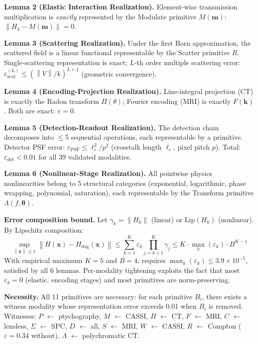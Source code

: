 \documentclass[11pt,a4paper]{article}
\newcommand{\norm}[1]{\left\|#1\right\|}
\newcommand{\eps}{\varepsilon}
\begin{document}
\textbf{Lemma 2 (Elastic Interaction Realization).}
Element-wise transmission multiplication is \emph{exactly} represented by the Modulate primitive $M(\mathbf{m})$: $\norm{H_k - M(\mathbf{m})} = 0$.

\textbf{Lemma 3 (Scattering Realization).}
Under the first Born approximation, the scattered field is a linear functional representable by the Scatter primitive $R$.  Single-scattering representation is exact; $L$-th order multiple scattering error: $\eps_{\mathrm{scat}}^{(L)} \leq (\norm{V}/k)^{L+1}$ (geometric convergence).

\textbf{Lemma 4 (Encoding-Projection Realization).}
Line-integral projection (CT) is exactly the Radon transform $\Pi(\theta)$; Fourier encoding (MRI) is exactly $F(\mathbf{k})$.  Both are exact: $\eps = 0$.

\textbf{Lemma 5 (Detection-Readout Realization).}
The detection chain decomposes into $\leq$5 sequential operations, each representable by a primitive.  Detector PSF error: $\eps_{\mathrm{PSF}} \leq \ell_c^2/p^2$ (crosstalk length $\ell_c$, pixel pitch $p$).  Total: $\eps_{\mathrm{det}} < 0.01$ for all 39 validated modalities.

\textbf{Lemma 6 (Nonlinear-Stage Realization).}
All pointwise physics nonlinearities belong to 5 structural categories (exponential, logarithmic, phase wrapping, polynomial, saturation), each representable by the Transform primitive $\Lambda(f, \boldsymbol{\theta})$.

\textbf{Error composition bound.}
Let $\gamma_k = \norm{H_k}$ (linear) or $\mathrm{Lip}(H_k)$ (nonlinear).  By Lipschitz composition:
\[
\sup_{\norm{\mathbf{x}} \leq 1} \norm{H(\mathbf{x}) - H_{\mathrm{dag}}(\mathbf{x})} \leq \sum_{k=1}^{K} \eps_k \prod_{j=k+1}^{K} \gamma_j \leq K \cdot \max_k(\eps_k) \cdot B^{K-1}
\]
With empirical maximum $K{=}5$ and $B{=}4$: requires $\max_k(\eps_k) \leq 3.9 \times 10^{-5}$, satisfied by all 6 lemmas.  Per-modality tightening exploits the fact that most $\eps_k = 0$ (elastic, encoding stages) and most primitives are norm-preserving.

\textbf{Necessity.}
All 11 primitives are necessary: for each primitive $B_i$, there exists a witness modality whose representation error exceeds 0.01 when $B_i$ is removed.  Witnesses: $P$ $\leftarrow$ ptychography, $M$ $\leftarrow$ CASSI, $\Pi$ $\leftarrow$ CT, $F$ $\leftarrow$ MRI, $C$ $\leftarrow$ lensless, $\Sigma$ $\leftarrow$ SPC, $D$ $\leftarrow$ all, $S$ $\leftarrow$ MRI, $W$ $\leftarrow$ CASSI, $R$ $\leftarrow$ Compton ($\eps = 0.34$ without), $\Lambda$ $\leftarrow$ polychromatic CT.
\end{document}
